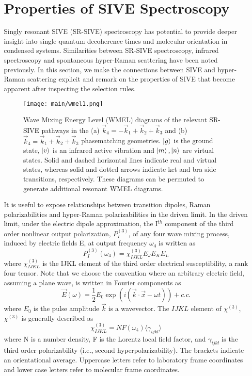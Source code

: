 \documentclass[aip, jcp, reprint, onecolumn]{revtex4-2}
\begin{document}
\section{Properties of SIVE Spectroscopy}
Singly resonant SIVE (SR-SIVE) spectroscopy has potential to provide deeper insight into single quantum decoherence times and molecular orientation in condensed systems.
Similarities between SR-SIVE spectroscopy, infrared spectroscopy and spontaneous hyper-Raman scattering have been noted previously. \cite{RN352, Bonn2024}
In this section, we make the connections between SIVE and hyper-Raman scattering explicit and remark on the properties of SIVE that become apparent after inspecting the selection rules.

\begin{figure}[!htbp]
	\centering
	\texttt{[image: main/wmel1.png]}
	\caption{Wave Mixing Energy Level (WMEL) diagrams of the relevant SR-SIVE pathways in the (a) $\vec{k}_4 = -\vec{k}_1 + \vec{k}_2 + \vec{k}_3$ and (b) $\vec{k}_4 = \vec{k}_1 + \vec{k}_2 + \vec{k}_3$ phasematching geometries. \cite{RN286, RN352}
	$\ket{g}$ is the ground state, $\ket{v}$ is an infrared active vibration and $\ket{m}, \ket{n}$ are virtual states.
	Solid and dashed horizontal lines indicate real and virtual states, whereas solid and dotted arrows indicate ket and bra side transitions, respectively. 
	These diagrams can be permuted to generate additional resonant WMEL diagrams.}
	\label{fig:sivewmel}
\end{figure}

It is useful to expose relationships between transition dipoles, Raman polarizabilities and hyper-Raman polarizabilities in the driven limit. \cite{Simpson2004, RN120}
In the driven limit, under the electric dipole approximation, the I$^{th}$ component of the third order nonlinear output polarization, ${P}^{(3)}_I$, of any four wave mixing process, induced by electric fields E, at output frequency $\omega_4$ is written as \cite{RN307}
\begin{equation} \label{polarization}
{P}^{(3)}_I (\omega_4)  = \chi^{(3)}_{IJKL} E_J E_K E_L 
\end{equation}
where $\chi^{(3)}_{IJKL}$ is the IJKL element of the third order electrical susceptibility, a rank four tensor. 
Note that we choose the convention where an arbitrary electric field, assuming a plane wave, is written in Fourier components as 
\begin{equation}
	\vec{E}(\omega) = \frac{1}{2} E_0 \exp(i(\vec{k}\cdot\vec{x} - \omega t)) + c.c.
\end{equation}
where $E_0$ is the pulse amplitude $\vec{k}$ is a wavevector.
The $IJKL$ element of $\chi^{(3)}$, $\chi^{(3)}$ is generally described as
\begin{equation}
	\chi^{(3)}_{IJKL} = NF(\omega_4) \langle \gamma_{ijkl} \rangle
\end{equation}
where N is a number density, F is the Lorentz local field factor, and $\gamma_{ijkl}$ is the third order polarizability (i.e., second hyperpolarizability). 
The brackets indicate an orientational average. 
Uppercase letters refer to laboratory frame coordinates and lower case letters refer to molecular frame coordinates.
\end{document}
